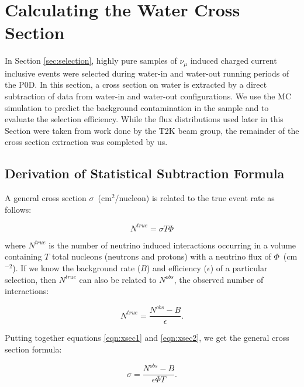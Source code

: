 \section{Calculating the Water Cross Section}
\label{sec:xsec}

In Section \ref{sec:selection}, highly pure samples of $\nu_\mu$ induced charged
current inclusive events were selected during water-in and water-out running
periods of the P0D. In this section, a cross
section on water is extracted by a direct subtraction of data
from water-in and water-out configurations. We use the MC
simulation to predict the background contamination in the sample and to evaluate the selection efficiency. While the flux distributions used later in this Section were taken from work done by the T2K beam group, the remainder of the cross section extraction was completed by us.

\subsection{Derivation of Statistical Subtraction Formula}

A general cross section $\sigma$~(cm$^2$/nucleon) is related to the true event rate as
follows:

\begin{equation}
N^{true} = \sigma T \Phi
\label{eqn:xsec1}
\end{equation}

where $N^{true}$ is the number of neutrino induced interactions
occurring in a volume containing $T$ total nucleons (neutrons and protons) with
a neutrino flux of $\Phi$~(cm$^{-2}$). If we know the background rate ($B$)
and efficiency ($\epsilon$) of a particular selection, then $N^{true}$ can also be
related to $N^{obs}$, the observed number of interactions:

\begin{equation}
N^{true}=\frac{N^{obs}-B}{\epsilon}.
\label{eqn:xsec2}
\end{equation}

Putting together equations \ref{eqn:xsec1} and \ref{eqn:xsec2}, we get
the general cross section formula:

\begin{equation}
\sigma = \frac{N^{obs}-B}{\epsilon \Phi T}.
\label{eqn:xsec3}
\end{equation}

